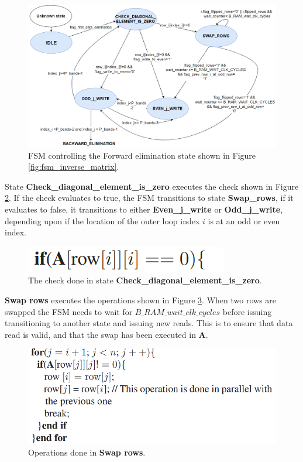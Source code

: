 \begin{figure}[H]
\centering
   \includegraphics[scale=0.4]{images/inverse_hw/fsm_forward_elimination.png}
  \caption{FSM controlling the Forward elimination state shown in Figure \ref{fig:fsm_inverse_matrix}.  } 
  \label{fig:fsm_forward_elimination}
\end{figure}




State \textbf{Check\_diagonal\_element\_is\_zero} executes the check shown in Figure \ref{fig:check_diagonal_element}. If the check evaluates to true, the FSM transitions to state \textbf{Swap\_rows}, if it evaluates to false, it transitions to either \textbf{Even\_j\_write} or \textbf{Odd\_j\_write}, depending upon if the location of the outer loop index $i$ is at an odd or even index. 
\begin{figure}[H]
\centering
   \includegraphics[scale=0.8]{images/inverse_fsms/forward_elim/check_diagonal_element_is_zero.png}
  \caption{The check done in state \textbf{Check\_diagonal\_element\_is\_zero}.  } 
  \label{fig:check_diagonal_element}
\end{figure}

\textbf{Swap rows} executes the operations shown in Figure \ref{fig:swap_rows}. When two rows are swapped the FSM needs to wait for $B\_RAM\_wait\_clk\_cycles$ before issuing transitioning to another state and issuing new reads. This is to ensure that data read is valid, and that the swap has been executed in \textbf{A}. 

\begin{figure}[H]
\centering
   \includegraphics[scale=0.68]{images/inverse_fsms/forward_elim/swap_rows.png}
  \caption{Operations done in \textbf{Swap rows}.  } 
  \label{fig:swap_rows}
\end{figure}

